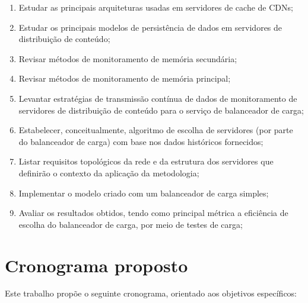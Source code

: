 \documentclass[11pt]{article}
\begin{document}
\begin{enumerate}
    \item Estudar as principais arquiteturas usadas em servidores de cache de CDNs;
    \item Estudar os principais modelos de persistência de dados em servidores de distribuição de conteúdo;
    \item Revisar métodos de monitoramento de memória secundária;
    \item Revisar métodos de monitoramento de memória principal;
    \item Levantar estratégias de transmissão contínua de dados de monitoramento de servidores de distribuição de conteúdo para o serviço de balanceador de carga;
    \item Estabelecer, conceitualmente, algoritmo de escolha de servidores (por parte do balanceador de carga) com base nos dados históricos fornecidos;
    \item Listar requisitos topológicos da rede e da estrutura dos servidores que definirão o contexto da aplicação da metodologia;
    \item Implementar o modelo criado com um balanceador de carga simples;
    \item Avaliar os resultados obtidos, tendo como principal métrica a eficiência de escolha do balanceador de carga, por meio de testes de carga; 
\end{enumerate}

\section{Cronograma proposto} \label{sec:Cronograma}

Este trabalho propõe o seguinte cronograma, orientado aos objetivos específicos:
\end{document}
